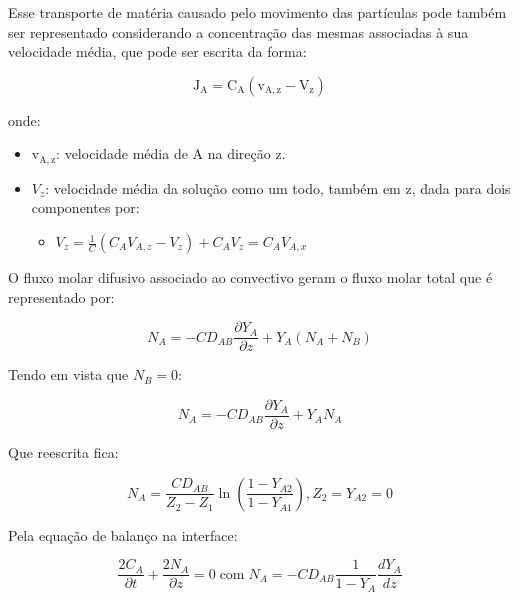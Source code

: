 Esse transporte de matéria causado pelo movimento das partículas pode também ser representado considerando a concentração das mesmas associadas à sua velocidade média, que pode ser escrita da forma: 


\begin{equation}\label{key}
\mathrm{J}_{\mathrm{A}}=\mathrm{C}_{\mathrm{A}}\left(\mathrm{v}_{\mathrm{A}, \mathrm{z}}-\mathrm{V}_{\mathrm{z}}\right)
\end{equation}


onde: 

\begin{itemize}
	\item $\mathrm{v}_{\mathrm{A}, \mathrm{z}}$: velocidade média de A na direção z.
	\item $V_{z}$: velocidade média da solução como um todo, também em z, dada para dois componentes por: 
	\begin{itemize}
		\item $V_{z}=\frac{1}{C}\left(C_{A} V_{A, z}-V_{z}\right)+C_{A} V_{z}=C_{A} V_{A, x}$
	\end{itemize}
\end{itemize}


O fluxo molar difusivo associado ao convectivo geram o fluxo molar total que é representado por:

\begin{equation}\label{key}
N_{A}=-C D_{A B} \frac{\partial Y _{A}}{\partial z}+Y_{A}\left(N_{A}+N_{B}\right)
\end{equation}

Tendo em vista que $N_{B} = 0$:

\begin{equation}\label{key}
N_{A}=-C D_{A B} \frac{\partial Y _{A}}{\partial z}+Y_{A} N_{A}
\end{equation}
\newpage

Que reescrita fica:

\begin{equation}\label{key}
N_{A}=\frac{C D _{A B}}{Z_{2}-Z_{1}} \ln \left(\frac{1-Y _{A 2}}{1-Y _{A 1}}\right), Z_{2}=Y_{A 2}=0
\end{equation}

Pela equação de balanço na interface:

\begin{equation}\label{key}
\frac{2 C _{A}}{\partial t}+\frac{2 N _{A}}{\partial z}=0 \operatorname{com} N_{A}=-C D_{A B} \frac{1}{1-Y _{A}} \frac{d Y _{A}}{d z}
\end{equation}

